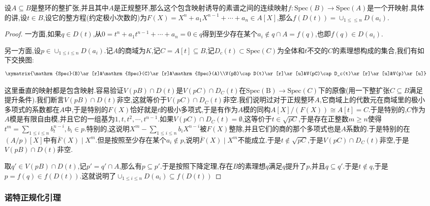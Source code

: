 设$A\subseteq B$是整环的整扩张,并且其中$A$是正规整环,那么这个包含映射诱导的素谱之间的连续映射$f:\mathrm{Spec}(B)\to\mathrm{Spec}(A)$是一个开映射.具体的讲,设$t\in B$,设它的整方程(约定极小次数的)为$F(X)=X^n+a_1X^{n-1}+\cdots+a_n\in A[X]$,那么$f(D(t))=\cup_{1\le \le n}D(a_i)$.
\begin{proof}
	
	一方面,如果$q\in D(t)$,从$0=t^n+a_1t^{n-1}+\cdots+a_n=0\in q$得到至少存在某个$a_i\not\in q\cap A=f(q)$,也即$f(q)\in D(a_i)$.
	
	另一方面,设$p\in\cup_{1\le i\le n}D(a_i)$.记$A$的商域为$K$,记$C=A[t]\subseteq B$,记$D_c(t)\subset\mathrm{Spec}(C)$为全体和$t$不交的$C$的素理想构成的集合,我们有如下交换图:
	$$\xymatrix{\mathrm{Spec}(B)\ar[r]&\mathrm{Spec}(C)\ar[r]&\mathrm{Spec}(A)\\V(pB)\cap D(t)\ar[r]\ar[u]&V(pC)\cap D_c(t)\ar[r]\ar[u]&V(p)\ar[u]}$$
	
	这里垂直的映射都是包含映射.容易验证$V(pB)\cap D(t)$是$V(pC)\cap D_C(t)$在$\mathrm{Spec(B)}\to\mathrm{Spec}(C)$下的原像(用一下整扩张$C\subseteq B$满足提升条件).我们断言$V(pB)\cap D(t)$非空,这就等价于$V(pC)\cap D_C(t)$非空.我们说明过对于正规整环$A$,它商域上的代数元在商域里的极小多项式的系数都在$A$中,于是特别的$F(X)$恰好就是$t$的极小多项式,于是有作为$A$模的同构$A[X]/(F(X))\cong A[t]=C$.于是特别的,$C$作为$A$模是有限自由模,并且它的一组基为$1,t,t^2,\cdots,t^{n-1}$.如果$V(pC)\cap D_C(t)=\emptyset$,这等价于$t\in\sqrt{pC}$,于是存在正整数$m\ge n$使得$t^m=\sum_{1\le i\le n}b_t^{n-i},b_i\in p$.特别的,这说明$X^m-\sum_{1\le i\le n}b_iX^{n-i}$被$F(X)$整除,并且它们的商的那个多项式也是$A$系数的.于是特别的在$(A/p)[X]$中有$\overline{F}(X)\mid X^m$.但是按照至少存在某个$a_i\not\in p$,说明$\overline{F}(X)\mid X^m$不能成立.于是$t\not\in\sqrt{pC}$,于是$V(pC)\cap D_C(t)$非空,于是$V(pB)\cap D(t)$非空.
	
	取$q'\in V(pB)\cap D(t)$,记$p'=q'\cap A$,那么有$p\subseteq p'$.于是按照下降定理,存在$B$的素理想$q$满足$q$提升了$p$,并且$q\subseteq q'$.于是$t\not\in q$,于是$p=f(q)\in f(D(t))$.这就说明了$\cup_{1\le i\le n}D(a_i)\subseteq f(D(t))$
\end{proof}

\subsubsection{诺特正规化引理}


